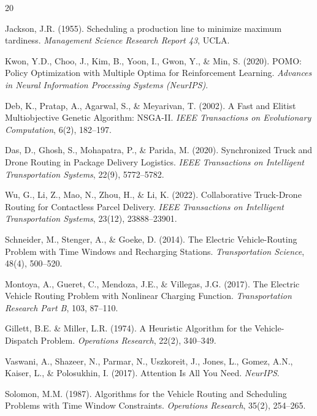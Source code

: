 \documentclass[11pt,a4paper]{article}
\begin{document}
\begin{thebibliography}{20}

Jackson, J.R. (1955). Scheduling a production line to minimize maximum tardiness.
\textit{Management Science Research Report 43}, UCLA.

Kwon, Y.D., Choo, J., Kim, B., Yoon, I., Gwon, Y., \& Min, S. (2020).
POMO: Policy Optimization with Multiple Optima for Reinforcement Learning.
\textit{Advances in Neural Information Processing Systems (NeurIPS)}.

Deb, K., Pratap, A., Agarwal, S., \& Meyarivan, T. (2002).
A Fast and Elitist Multiobjective Genetic Algorithm: NSGA-II.
\textit{IEEE Transactions on Evolutionary Computation}, 6(2), 182--197.

Das, D., Ghosh, S., Mohapatra, P., \& Parida, M. (2020).
Synchronized Truck and Drone Routing in Package Delivery Logistics.
\textit{IEEE Transactions on Intelligent Transportation Systems}, 22(9), 5772--5782.

Wu, G., Li, Z., Mao, N., Zhou, H., \& Li, K. (2022).
Collaborative Truck-Drone Routing for Contactless Parcel Delivery.
\textit{IEEE Transactions on Intelligent Transportation Systems}, 23(12), 23888--23901.

Schneider, M., Stenger, A., \& Goeke, D. (2014).
The Electric Vehicle-Routing Problem with Time Windows and Recharging Stations.
\textit{Transportation Science}, 48(4), 500--520.

Montoya, A., Gueret, C., Mendoza, J.E., \& Villegas, J.G. (2017).
The Electric Vehicle Routing Problem with Nonlinear Charging Function.
\textit{Transportation Research Part B}, 103, 87--110.

Gillett, B.E. \& Miller, L.R. (1974).
A Heuristic Algorithm for the Vehicle-Dispatch Problem.
\textit{Operations Research}, 22(2), 340--349.

Vaswani, A., Shazeer, N., Parmar, N., Uszkoreit, J., Jones, L., Gomez, A.N.,
Kaiser, L., \& Polosukhin, I. (2017).
Attention Is All You Need. \textit{NeurIPS}.

Solomon, M.M. (1987).
Algorithms for the Vehicle Routing and Scheduling Problems with Time Window Constraints.
\textit{Operations Research}, 35(2), 254--265.

\end{thebibliography}
\end{document}

